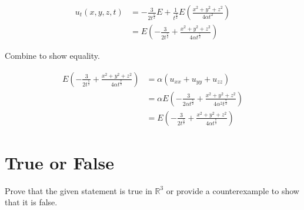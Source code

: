 \documentclass[11pt]{article}
\begin{document}
\begin{enumerate}
  \begin{equation}
    \label{p8:ut}
    \begin{split}
      u_t(x,y,z,t) &= -\frac{3}{2t^{\frac{5}{2}}} E + \frac{1}{t^{\frac{3}{2}}}
                     E \left( \frac{x^2 + y^2 + z^2}{4\alpha t^2} \right) \\
                   &= E \left( -\frac{3}{2t^{\frac{5}{2}}} + \frac{x^2 + y^2 + z^2}{4\alpha
                     t^{\frac{7}{2}}} \right)
    \end{split}
  \end{equation}

  Combine to show equality.

  \begin{align*}
    E \left( -\frac{3}{2t^{\frac{5}{2}}} + \frac{x^2 + y^2 + z^2}{4\alpha
    t^{\frac{7}{2}}} \right) &= \alpha \left( u_{xx} + u_{yy} + u_{zz}
                               \right) \\
                             &= \alpha E \left( -\frac{3}{2\alpha t^{\frac{5}{2}}} + \frac{x^2 + y^2
                               + z^2}{4\alpha^2 t^{\frac{7}{2}}} \right) \\
                             &= E \left( -\frac{3}{2 t^{\frac{5}{2}}} + \frac{x^2 + y^2 +
                               z^2}{4\alpha t^{\frac{7}{2}}} \right)
  \end{align*}

\end{enumerate}

\newpage
\section*{True or False}
Prove that the given statement is true in \(\mathbb{R}^3\) or provide a counterexample to show that it is false.
\end{document}
